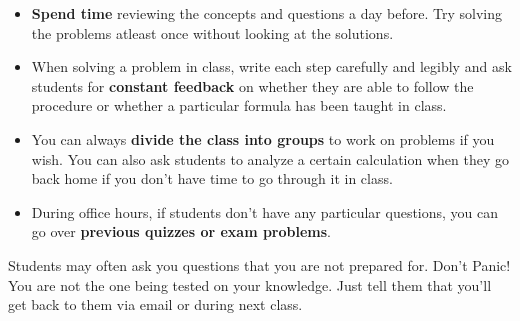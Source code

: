 \begin{itemize}[leftmargin=10pt]
\item \textbf{Spend time} reviewing the concepts and questions a day before. Try solving the problems atleast once without looking at the solutions. \\

\item When solving a problem in class, write each step carefully and legibly and ask students for \textbf{constant feedback} on whether they are able to follow the procedure or whether a particular formula has been taught in class. \\

\item You can always \textbf{divide the class into groups} to work on problems if you wish. You can also ask students to analyze a certain calculation when they go back home if you don't have time to go through it in class. \\

\item During office hours, if students don't have any particular questions, you can go over \textbf{previous quizzes or exam problems}. \\
\end{itemize}

\begin{plaincorollary}
    Students may often ask you questions that you are not prepared for. Don't Panic! You are not the one being tested on your knowledge. Just tell them that you'll get back to them via email or during next class.
\end{plaincorollary} 



